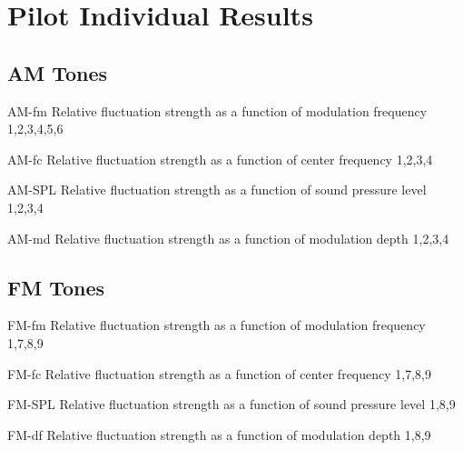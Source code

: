 \documentclass[../main.tex]{subfiles}
\begin{document}
\chapter{Pilot Individual Results}

\begin{pilotresults}

\section{AM Tones}

  {AM-fm}
  {Relative fluctuation strength as a function of modulation frequency}
  {1,2,3,4,5,6}

  {AM-fc}
  {Relative fluctuation strength as a function of center frequency}
  {1,2,3,4}

  {AM-SPL}
  {Relative fluctuation strength as a function of sound pressure level}
  {1,2,3,4}

  {AM-md}
  {Relative fluctuation strength as a function of modulation depth}
  {1,2,3,4}

\section{FM Tones}

  {FM-fm}
  {Relative fluctuation strength as a function of modulation frequency}
  {1,7,8,9}

  {FM-fc}
  {Relative fluctuation strength as a function of center frequency}
  {1,7,8,9}

  {FM-SPL}
  {Relative fluctuation strength as a function of sound pressure level}
  {1,8,9}

  {FM-df}
  {Relative fluctuation strength as a function of modulation depth}
  {1,8,9}

\end{pilotresults}
\end{document}
